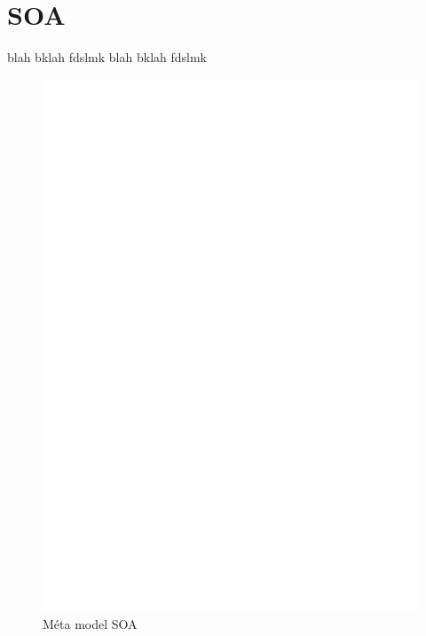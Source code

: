 \section{SOA}\label{sub:soa}
blah bklah fdslmk blah bklah fdslmk 
\begin{figure}[htb]
  \centering
  \includegraphics[scale=.3]{img/SOA.eps}
  \caption{Méta model SOA}
  \label{fig:soa}
\end{figure}

